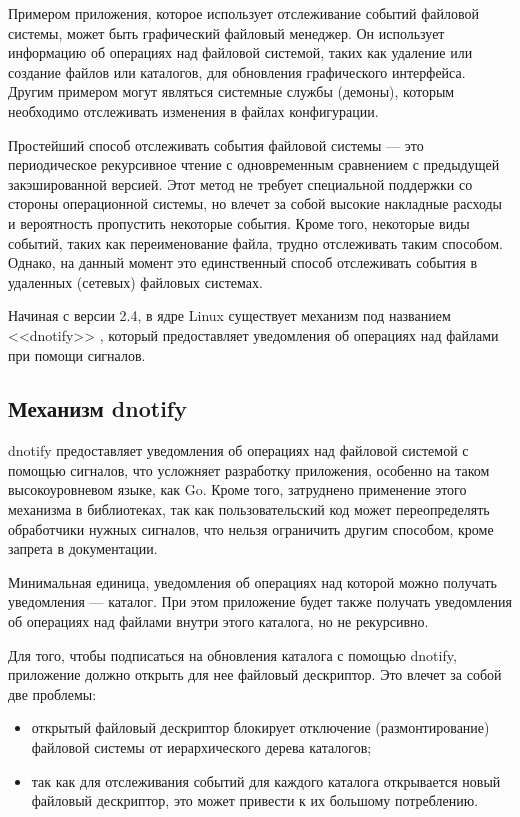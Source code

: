 \documentclass[14pt, russian]{scrartcl}
\begin{document}
Примером приложения, которое использует отслеживание событий файловой системы,
может быть графический файловый менеджер. Он использует информацию об операциях
над файловой системой, таких как удаление или создание файлов или каталогов,
для обновления графического интерфейса. Другим примером могут являться системные
службы (демоны), которым необходимо отслеживать изменения в файлах конфигурации.

Простейший способ отслеживать события файловой системы --- это периодическое
рекурсивное чтение с одновременным сравнением с предыдущей закэшированной
версией. Этот метод не требует специальной поддержки со стороны операционной
системы, но влечет за собой высокие накладные расходы и вероятность пропустить
некоторые события. Кроме того, некоторые виды событий, таких как переименование
файла, трудно отслеживать таким способом. Однако, на данный момент это
единственный способ отслеживать события в удаленных (сетевых) файловых системах.

Начиная с версии 2.4, в ядре Linux существует механизм под названием <<dnotify>>
\cite{kerrisk2010linux}, который предоставляет уведомления об операциях над
файлами при помощи сигналов.

\subsection{Механизм dnotify}

dnotify предоставляет уведомления об операциях над файловой системой с помощью
сигналов, что усложняет разработку приложения, особенно на таком высокоуровневом
языке, как Go. Кроме того, затруднено применение этого механизма в библиотеках,
так как пользовательский код может переопределять обработчики нужных сигналов,
что нельзя ограничить другим способом, кроме запрета в документации.

Минимальная единица, уведомления об операциях над которой можно получать
уведомления --- каталог. При этом приложение будет также получать уведомления
об операциях над файлами внутри этого каталога, но не рекурсивно.

Для того, чтобы подписаться на обновления каталога с помощью dnotify, приложение
должно открыть для нее файловый дескриптор. Это влечет за собой две проблемы:

\begin{itemize}
  \item открытый файловый дескриптор блокирует отключение (размонтирование)
        файловой системы от иерархического дерева каталогов;
  \item так как для отслеживания событий для каждого каталога открывается новый
        файловый дескриптор, это может привести к их большому потреблению.
\end{itemize}
\end{document}
